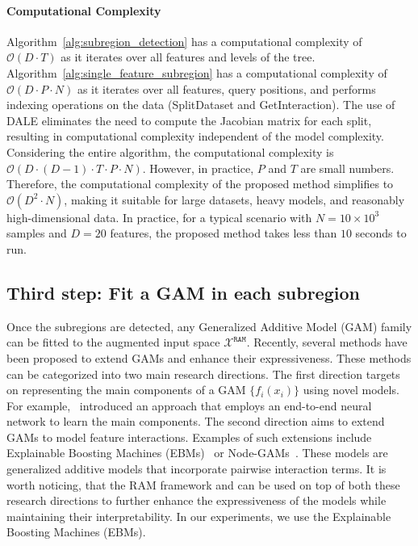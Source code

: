 \documentclass[12pt]{article}
\begin{document}
\paragraph{Computational Complexity}


Algorithm~\ref{alg:subregion_detection} has a computational complexity of $\mathcal{O}(D \cdot T)$
as it iterates over all features and levels of the tree.
Algorithm~\ref{alg:single_feature_subregion} has a computational complexity of $\mathcal{O}(D \cdot P \cdot N)$
as it iterates over all features, query positions, and performs indexing operations on the data (SplitDataset and GetInteraction).
The use of DALE eliminates the need to compute the Jacobian matrix for each split,
resulting in computational complexity independent of the model complexity.
Considering the entire algorithm, the computational complexity is $\mathcal{O}(D \cdot (D-1) \cdot T \cdot P \cdot N)$.
However, in practice, $P$ and $T$ are small numbers.
Therefore, the computational complexity of the proposed method simplifies to $\mathcal{O}(D^2 \cdot N)$,
making it suitable for large datasets, heavy models, and reasonably high-dimensional data.
In practice, for a typical scenario with $N=10 \times 10^3$ samples and $D=20$ features, the proposed method takes less than $10$ seconds to run.

\subsection{Third step: Fit a GAM in each subregion}
\label{subsec:fitting_gams}

Once the subregions are detected, any Generalized Additive Model (GAM) family can be fitted to the augmented input space $\mathcal{X}^{\mathtt{RAM}}$.
Recently, several methods have been proposed to extend GAMs and enhance their expressiveness.
These methods can be categorized into two main research directions.
The first direction targets on representing the main components of a GAM $\{ f_i(x_i) \}$ using novel models.
For example,~\citep{agarwal2021neural} introduced an approach that employs an end-to-end neural network to learn the main components.
The second direction aims to extend GAMs to model feature interactions.
Examples of such extensions include Explainable Boosting Machines (EBMs)~\citep{lou2013accurate} or
Node-GAMs~\citep{chang2021node}.
These models are generalized additive models that incorporate pairwise interaction terms.
It is worth noticing, that the RAM framework and can be used on top of both these research directions
to further enhance the expressiveness of the models while maintaining their interpretability.
In our experiments, we use the Explainable Boosting Machines (EBMs).
\end{document}
